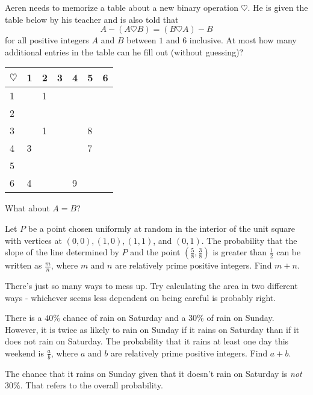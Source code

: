 \documentclass[mast]{lucky}
\begin{document}
\begin{prob}{3}
Aeren needs to memorize a table about a new binary operation $\heartsuit$. He is given the table below by his teacher and is also told that
\[A - (A \heartsuit B) = (B \heartsuit A) - B\]for all positive integers $A$ and $B$ between $1$ and $6$ inclusive. At most how many additional entries in the table can he fill out (without guessing)?
\begin{center}
\begin{tabular}{l|llllll} $\heartsuit$ & 1 & 2 & 3 & 4 & 5 & 6 \\ \hline 1 & & 1 & & & & \\ 2 & & & & & & \\ 3 & & 1 & & & 8 & \\ 4 & 3 & & & & 7 & \\ 5 & & & & & & \\ 6 & 4 & & & 9 & & \end{tabular}
\end{center}
\begin{mistakes}
    \begin{mistake}
        What about $A=B$?
    \end{mistake}
\end{mistakes}
\end{prob}

\begin{prob}[AIME II 2020/2]{3}
Let $P$ be a point chosen uniformly at random in the interior of the unit square with vertices at $(0,0), (1,0), (1,1)$, and $(0,1)$. The probability that the slope of the line determined by $P$ and the point $\left(\frac58, \frac38 \right)$ is greater than $\frac12$ can be written as $\frac{m}{n}$, where $m$ and $n$ are relatively prime positive integers. Find $m+n$.
\begin{mistakes}
    \begin{mistake}
        There's just so many ways to mess up. Try calculating the area in two different ways - whichever seems less dependent on being careful is probably right.
    \end{mistake}
\end{mistakes}
\end{prob}

\begin{prob}[AIME II 2016/2]{4}
There is a $40\%$ chance of rain on Saturday and a $30\%$ of rain on Sunday. However, it is twice as likely to rain on Sunday if it rains on Saturday than if it does not rain on Saturday. The probability that it rains at least one day this weekend is $\frac{a}{b}$, where $a$ and $b$ are relatively prime positive integers. Find $a+b$.
\begin{mistakes}
    \begin{mistake}
        The chance that it rains on Sunday given that it doesn't rain on Saturday is \emph{not} $30\%.$ That refers to the overall probability.
    \end{mistake}
\end{mistakes}
\end{prob}
\end{document}
